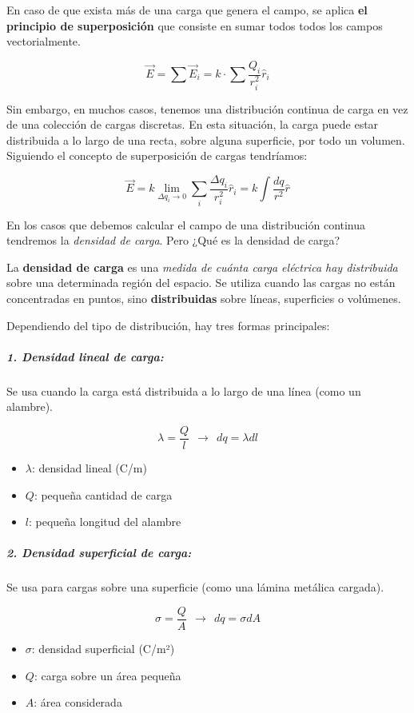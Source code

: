 En caso de que exista más de una carga que genera el campo, se aplica \textbf{el principio de superposición} que consiste en sumar todos todos los campos vectorialmente.

\[
\vec{E} = \sum{\vec{E}_i} = k \cdot \sum{\frac{Q_i}{r^2_i}} \hat{r}_i
\]

Sin embargo, en muchos casos, tenemos una distribución continua de carga en vez de una colección de cargas discretas. En esta situación, la carga puede estar distribuida a lo largo de una recta, sobre alguna superficie, por todo un volumen. Siguiendo el concepto de superposición de cargas tendríamos:

\[
\vec{E} = k \lim_{\Delta q_i \to 0} \sum_i{\frac{\Delta q_i}{r_i^2}\hat{r}_i} = k \int \frac{dq}{r^2} \hat{r}
\]

En los casos que debemos calcular el campo de una distribución continua tendremos la \textit{densidad de carga}. Pero ¿Qué es la densidad de carga?

La \textbf{densidad de carga} es una \textit{medida de cuánta carga eléctrica hay distribuida} sobre una determinada región del espacio. Se utiliza cuando las cargas no están concentradas en puntos, sino \textbf{distribuidas} sobre líneas, superficies o volúmenes.

Dependiendo del tipo de distribución, hay tres formas principales:

\subparagraph{1. Densidad lineal de carga:}

Se usa cuando la carga está distribuida a lo largo de una línea (como un alambre).

\[
\lambda = \frac{Q}{l} ~ ~ \rightarrow ~ ~ dq = \lambda dl
\]

\begin{itemize}
    \item \( \lambda \): densidad lineal (C/m)  
    \item \( Q \): pequeña cantidad de carga  
    \item \( l \): pequeña longitud del alambre  
\end{itemize}

\subparagraph{2. Densidad superficial de carga:}

Se usa para cargas sobre una superficie (como una lámina metálica cargada).

\[
\sigma = \frac{Q}{A} ~ ~ \rightarrow ~ ~ dq = \sigma dA
\]

\begin{itemize}
    \item \( \sigma \): densidad superficial (C/m²)  
    \item \( Q \): carga sobre un área pequeña  
    \item \( A \): área considerada  
\end{itemize}

